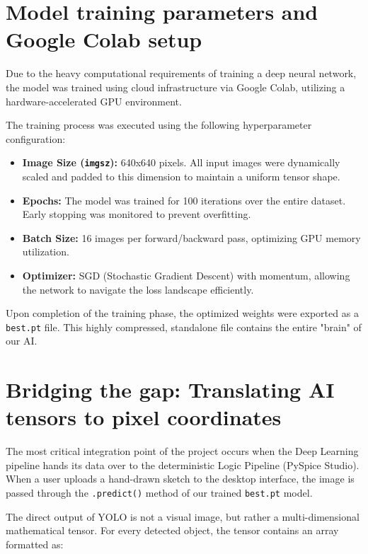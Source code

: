 \section{Model training parameters and Google Colab setup}
Due to the heavy computational requirements of training a deep neural network, the model was trained using cloud infrastructure via Google Colab, utilizing a hardware-accelerated GPU environment.

The training process was executed using the following hyperparameter configuration:
\begin{itemize}
    \item \textbf{Image Size (\texttt{imgsz}):} 640x640 pixels. All input images were dynamically scaled and padded to this dimension to maintain a uniform tensor shape.
    \item \textbf{Epochs:} The model was trained for 100 iterations over the entire dataset. Early stopping was monitored to prevent overfitting.
    \item \textbf{Batch Size:} 16 images per forward/backward pass, optimizing GPU memory utilization.
    \item \textbf{Optimizer:} SGD (Stochastic Gradient Descent) with momentum, allowing the network to navigate the loss landscape efficiently.
\end{itemize}
Upon completion of the training phase, the optimized weights were exported as a \texttt{best.pt} file. This highly compressed, standalone file contains the entire "brain" of our AI.

\section{Bridging the gap: Translating AI tensors to pixel coordinates}
The most critical integration point of the project occurs when the Deep Learning pipeline hands its data over to the deterministic Logic Pipeline (PySpice Studio). When a user uploads a hand-drawn sketch to the desktop interface, the image is passed through the \texttt{.predict()} method of our trained \texttt{best.pt} model.

The direct output of YOLO is not a visual image, but rather a multi-dimensional mathematical tensor. For every detected object, the tensor contains an array formatted as:
\begin{equation}
    [\text{Class\_ID}, \text{Confidence\_Score}, x_{center}, y_{center}, \text{width}, \text{height}]
\end{equation}

